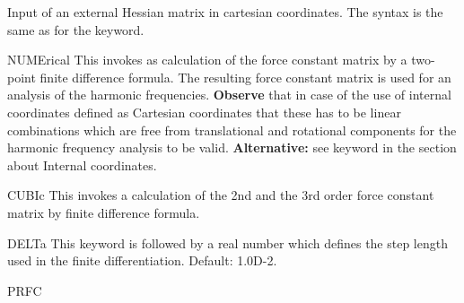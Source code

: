 \begin{keywordlist}
Input of an external Hessian matrix in cartesian coordinates. The
syntax is the same as for the  keyword.
\item[NUMErical]
This invokes as calculation of the force constant matrix by a
two-point finite difference formula. The resulting force
constant matrix is used for an analysis of the harmonic
frequencies. {\bf Observe} that in case of the use of internal
coordinates defined as Cartesian coordinates that these has to be
linear combinations which are free from translational and
rotational components for the harmonic frequency analysis to be
valid. {\bf Alternative:} see keyword  in the section
about Internal coordinates.
\item[CUBIc]
This invokes a calculation of the 2nd and the 3rd order
force constant matrix by finite difference formula.
\item[DELTa]
This keyword is followed by a real number which defines the
step length used in the finite differentiation. Default: 1.0D-{}2.
\item[PRFC]

\end{keywordlist}
